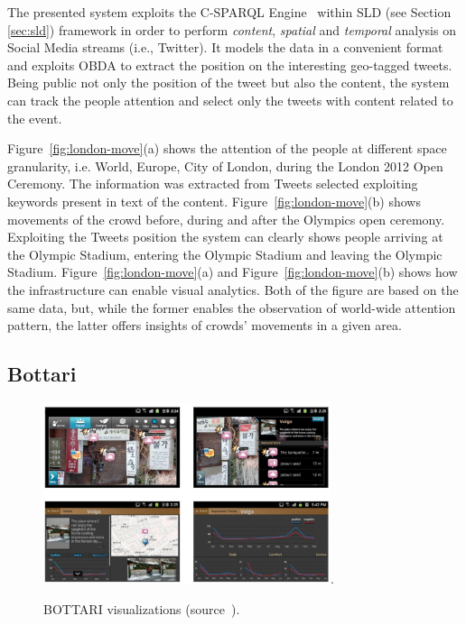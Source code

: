 The presented system exploits the C-SPARQL Engine~\cite{DBLP:journals/ijsc/BarbieriBCVG10} within SLD (see Section \ref{sec:sld}) framework in order to perform \textit{content}, \textit{spatial} and \textit{temporal} analysis on Social Media streams (i.e., Twitter). 
It models the data in a convenient format and exploits OBDA to extract the position on the interesting geo-tagged tweets. 
Being public not only the position of the tweet but also the content, the system can track the people attention and select only the tweets with content related to the event. 

Figure~\ref{fig:london-move}(a) shows the attention of the people at different space granularity, i.e. World, Europe, City of London, during the London 2012 Open Ceremony. The information was extracted from Tweets selected exploiting keywords present in text of the content.
Figure~\ref{fig:london-move}(b) shows movements of the crowd before, during and after the Olympics open ceremony. Exploiting the Tweets position the system can clearly shows people arriving at the Olympic Stadium, entering the Olympic Stadium and leaving the Olympic Stadium.
Figure~\ref{fig:london-move}(a) and Figure~\ref{fig:london-move}(b) shows how the infrastructure can enable visual analytics. 
Both of the figure are based on the same data, but, while the former enables the observation of world-wide attention pattern, the latter offers insights of crowds' movements in a given area.

\subsection{Bottari} \label{sec:uda-bottari}

\begin{figure}[t]
	\centering
	\includegraphics[width=0.75\textwidth]{img/bottari2.pdf}.
    \caption{BOTTARI visualizations (source~\cite{DBLP:conf/semweb/BalduiniVDTPC13}).}
    \label{fig:bottari-vis}
\end{figure}

